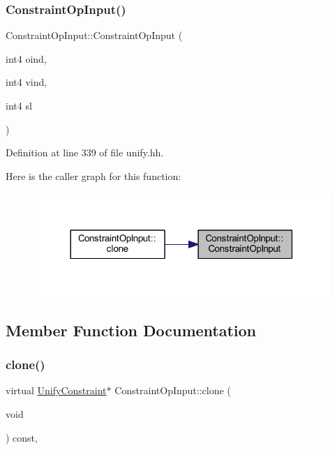 \subsubsection{\texorpdfstring{ConstraintOpInput()}{ConstraintOpInput()}}
{\footnotesize\ttfamily Constraint\+Op\+Input\+::\+Constraint\+Op\+Input (\begin{DoxyParamCaption}\item[{int4}]{oind,  }\item[{int4}]{vind,  }\item[{int4}]{sl }\end{DoxyParamCaption})\hspace{0.3cm}{\ttfamily [inline]}}



Definition at line 339 of file unify.\+hh.

Here is the caller graph for this function\+:
\nopagebreak
\begin{figure}[H]
\begin{center}
\leavevmode
\includegraphics[width=318pt]{class_constraint_op_input_ab30df7a8432baa0c79c7e909c198ef65_icgraph}
\end{center}
\end{figure}


\subsection{Member Function Documentation}
\mbox{\label{class_constraint_op_input_a59e0a95fa29163053aaf79e29697fd3c}} 
\subsubsection{\texorpdfstring{clone()}{clone()}}
{\footnotesize\ttfamily virtual \mbox{\hyperlink{class_unify_constraint}{Unify\+Constraint}}$\ast$ Constraint\+Op\+Input\+::clone (\begin{DoxyParamCaption}\item[{void}]{ }\end{DoxyParamCaption}) const\hspace{0.3cm}{\ttfamily [inline]}, {\ttfamily [virtual]}}



